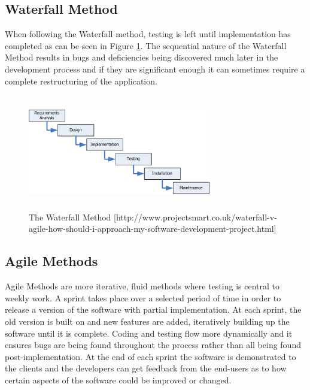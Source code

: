 \documentclass{l4proj}
\begin{document}
\subsection{Waterfall Method}
When following the Waterfall method, testing is left until implementation has completed as can be seen in Figure \ref{Waterfall Method}.  The sequential nature of the Waterfall Method results in bugs and deficiencies being discovered much later in the development process and if they are significant enough it can sometimes require a complete restructuring of the application.  

\begin{figure}
\centering
\includegraphics[height=5cm,width=8cm]{waterfall-method.png}
\caption{The Waterfall Method [http://www.projectsmart.co.uk/waterfall-v-agile-how-should-i-approach-my-software-development-project.html]}
\label{Waterfall Method}
\end{figure}

\subsection{Agile Methods}
Agile Methods are more iterative, fluid methods where testing is central to weekly work.  A sprint takes place over a selected period of time in order to release a version of the software with partial implementation. At each sprint, the old version is built on and new features are added, iteratively building up the software until it is complete. Coding and testing flow more dynamically and it ensures bugs are being found throughout the process rather than all being found post-implementation.  At the end of each sprint the software is demonstrated to the clients and the developers can get feedback from the end-users as to how certain aspects of the software could be improved or changed.
\end{document}
